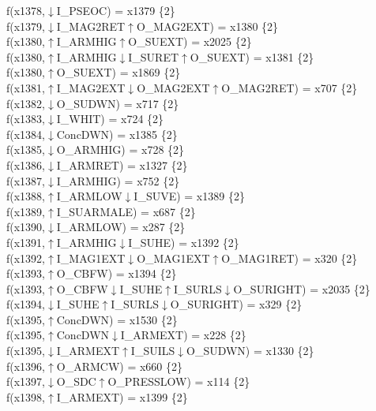 f(x1378,$\downarrow$I\_PSEOC) = x1379 \{2\} \\  
f(x1379,$\downarrow$I\_MAG2RET$\uparrow$O\_MAG2EXT) = x1380 \{2\} \\  
f(x1380,$\uparrow$I\_ARMHIG$\uparrow$O\_SUEXT) = x2025 \{2\} \\  
f(x1380,$\uparrow$I\_ARMHIG$\downarrow$I\_SURET$\uparrow$O\_SUEXT) = x1381 \{2\} \\  
f(x1380,$\uparrow$O\_SUEXT) = x1869 \{2\} \\  
f(x1381,$\uparrow$I\_MAG2EXT$\downarrow$O\_MAG2EXT$\uparrow$O\_MAG2RET) = x707 \{2\} \\  
f(x1382,$\downarrow$O\_SUDWN) = x717 \{2\} \\  
f(x1383,$\downarrow$I\_WHIT) = x724 \{2\} \\  
f(x1384,$\downarrow$ConcDWN) = x1385 \{2\} \\  
f(x1385,$\downarrow$O\_ARMHIG) = x728 \{2\} \\  
f(x1386,$\downarrow$I\_ARMRET) = x1327 \{2\} \\  
f(x1387,$\downarrow$I\_ARMHIG) = x752 \{2\} \\  
f(x1388,$\uparrow$I\_ARMLOW$\downarrow$I\_SUVE) = x1389 \{2\} \\  
f(x1389,$\uparrow$I\_SUARMALE) = x687 \{2\} \\  
f(x1390,$\downarrow$I\_ARMLOW) = x287 \{2\} \\  
f(x1391,$\uparrow$I\_ARMHIG$\downarrow$I\_SUHE) = x1392 \{2\} \\  
f(x1392,$\uparrow$I\_MAG1EXT$\downarrow$O\_MAG1EXT$\uparrow$O\_MAG1RET) = x320 \{2\} \\  
f(x1393,$\uparrow$O\_CBFW) = x1394 \{2\} \\  
f(x1393,$\uparrow$O\_CBFW$\downarrow$I\_SUHE$\uparrow$I\_SURLS$\downarrow$O\_SURIGHT) = x2035 \{2\} \\  
f(x1394,$\downarrow$I\_SUHE$\uparrow$I\_SURLS$\downarrow$O\_SURIGHT) = x329 \{2\} \\  
f(x1395,$\uparrow$ConcDWN) = x1530 \{2\} \\  
f(x1395,$\uparrow$ConcDWN$\downarrow$I\_ARMEXT) = x228 \{2\} \\  
f(x1395,$\downarrow$I\_ARMEXT$\uparrow$I\_SUILS$\downarrow$O\_SUDWN) = x1330 \{2\} \\  
f(x1396,$\uparrow$O\_ARMCW) = x660 \{2\} \\  
f(x1397,$\downarrow$O\_SDC$\uparrow$O\_PRESSLOW) = x114 \{2\} \\  
f(x1398,$\uparrow$I\_ARMEXT) = x1399 \{2\} \\  
